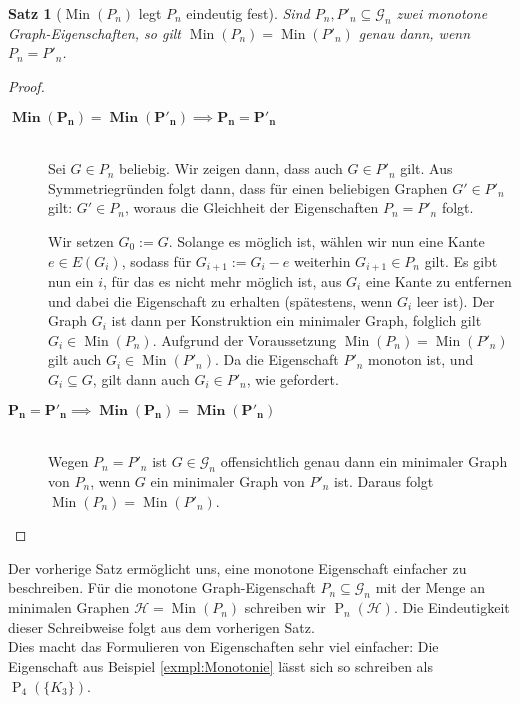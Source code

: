 \documentclass[10pt,a4paper, footheight=1mm]{scrreprt}
\newtheorem{Satz}[definition]{Satz}
\theoremstyle{definition}
\DeclareMathOperator\Min{Min}
\begin{document}
\begin{Satz}[$\Min(P_n)$ legt $P_n$ eindeutig fest]
Sind $P_n, P'_n \subseteq \mathcal{G}_n$ zwei monotone 
Graph-Eigenschaften, so gilt
$\Min(P_n) = \Min(P'_n)$ genau dann, wenn $P_n = P'_n$.
\end{Satz}
\begin{proof} \hfill
\vspace*{-3mm}
\begin{description}
\item[$\boldsymbol{\Min(P_n) = \Min(P'_n) \implies P_n = P'_n}$]
\hfill \\
Sei $G \in P_n$ beliebig. Wir zeigen dann, dass auch $G \in P'_n$
gilt. Aus Symmetriegründen folgt dann, dass für einen  beliebigen
Graphen $G' \in P'_n$ gilt: $G' \in P_n$, woraus die Gleichheit der
Eigenschaften $P_n = P'_n$ folgt.

Wir setzen $G_0 := G$. Solange es möglich ist, wählen wir nun
eine Kante $e \in E(G_i)$, sodass für $G_{i+1} := G_i - e$  
weiterhin $G_{i+1} \in P_n$ gilt.
Es gibt nun ein $i$, für das es nicht mehr möglich ist,
aus $G_i$ eine Kante zu entfernen und dabei die Eigenschaft
zu erhalten (spätestens, wenn $G_i$ leer ist).
Der Graph $G_i$ ist dann per Konstruktion ein minimaler
Graph, folglich gilt $G_i \in \Min(P_n)$. Aufgrund der
Voraussetzung $\Min(P_n) = \Min(P'_n)$ gilt auch 
$G_i \in \Min(P'_n)$. Da die Eigenschaft $P'_n$ monoton ist,
und $G_i \subseteq G$, gilt dann auch $G_i \in P'_n$,
wie gefordert.
\vspace*{-2mm}
\item[$\boldsymbol{P_n = P'_n \implies \Min(P_n) = \Min(P'_n)}$]
\hfill \\
Wegen $P_n = P'_n$ ist $G \in \mathcal{G}_n$ offensichtlich
genau dann ein minimaler Graph von $P_n$, wenn $G$ ein 
minimaler Graph von $P'_n$ ist. Daraus folgt 
$\Min(P_n) = \Min(P'_n)$. \qedhere
\end{description}
\end{proof}
Der vorherige Satz ermöglicht uns, eine
monotone Eigenschaft einfacher zu beschreiben. 
Für die monotone Graph-Eigenschaft $P_n\subseteq \mathcal{G}_n$
mit der Menge an minimalen Graphen $\mathcal{H} = \Min(P_n)$
schreiben wir $\operatorname{P}_n(\mathcal{H})$. Die Eindeutigkeit dieser
Schreibweise folgt aus dem vorherigen Satz. \\
Dies macht das Formulieren von Eigenschaften sehr viel einfacher:
Die Eigenschaft aus Beispiel \ref{exmpl:Monotonie} lässt sich
so schreiben als $\operatorname{P}_4(\{K_3\})$.
\end{document}
